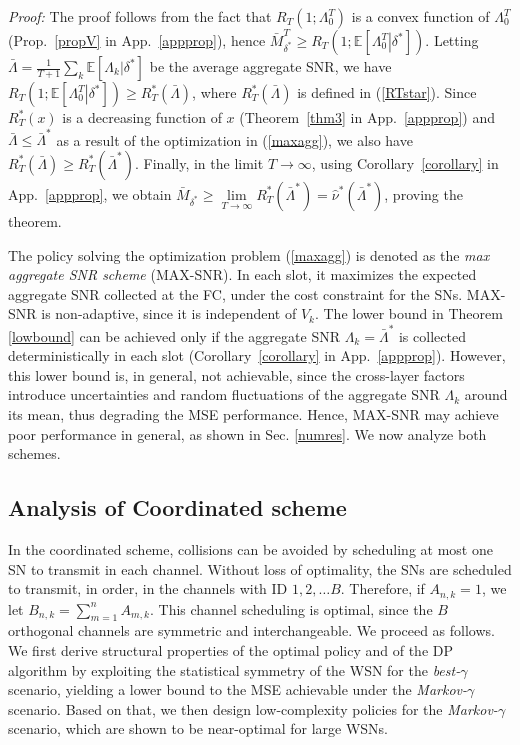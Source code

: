 \documentclass[10pt,twocolumn,twoside]{IEEEtran}
\theoremstyle{plain}
\begin{document}
\noindent\emph{Proof:}
The proof follows from the fact that $R_T(1;\Lambda_0^T)$ is a convex function of $\Lambda_0^T$ (Prop.~\ref{propV} in App.~\ref{appprop}),
hence $\bar M_{\delta^*}^T{\geq}R_T(1;\mathbb E\left[\left.\Lambda_0^T\right|\delta^*\right])$. 
Letting $\bar \Lambda{=}\frac{1}{T+1}\sum_{k}\mathbb E\left[\left.\Lambda_k\right|\delta^*\right]$ be the average aggregate SNR, we have 
$R_T(1;\mathbb E\left[\left.\Lambda_0^T\right|\delta^*\right]){\geq}R_T^*(\bar\Lambda)$,
where $R_T^*(\bar\Lambda)$ is defined in (\ref{RTstar}). Since $R_T^*(x)$ is a decreasing function of $x$ (Theorem~\ref{thm3} in App.~\ref{appprop}) and 
$\bar\Lambda{\leq}\bar\Lambda^*$ as a result of the optimization in (\ref{maxagg}),
we also have $R_T^*(\bar\Lambda){\geq}R_T^*(\bar\Lambda^*)$. Finally, in the limit $T{\to}\infty$, using Corollary~\ref{corollary} in App.~\ref{appprop},
we obtain $\bar M_{\delta^*}{\geq}\underset{T\to\infty}{\lim}R_T^*(\bar\Lambda^*){=}\hat \nu^*\left(\bar\Lambda^*\right)$, proving the theorem.\hfill\QED


The policy solving the optimization problem (\ref{maxagg}) is denoted as the \emph{max aggregate SNR scheme} (MAX-SNR). In each slot, it maximizes the expected 
aggregate SNR collected at the FC, under the cost constraint for the SNs.
MAX-SNR is non-adaptive, since it is independent of $V_k$.
The lower bound in Theorem \ref{lowbound} can be achieved only if the aggregate SNR $\Lambda_k{=}\bar\Lambda^*$ is collected deterministically in each slot
 (Corollary~\ref{corollary} in App.~\ref{appprop}).
However, this lower bound is, in general, not achievable, 
since the cross-layer factors introduce uncertainties and random fluctuations of the aggregate SNR $\Lambda_k$ around its mean, thus
degrading the MSE performance. Hence, MAX-SNR may achieve poor performance in general, as shown in Sec. \ref{numres}.
We now analyze both schemes.
\vspace{-3mm}
\subsection{Analysis  of Coordinated scheme}
\label{centr}
\noindent In the coordinated scheme, collisions can be avoided by scheduling at most one SN to transmit in each channel.
Without loss of optimality, the SNs are scheduled to transmit, in order, in
the channels with ID $1,2,\dots B$. Therefore,
if $A_{n,k}{=}1$, we let $B_{n,k}{=}\sum_{m=1}^{n}A_{m,k}$. This channel scheduling is optimal, since the $B$ orthogonal channels are symmetric and interchangeable.
We proceed as follows. We first derive structural properties of the optimal policy and of the DP
algorithm by exploiting the statistical symmetry of the WSN for the \emph{best-}$\gamma$ scenario, yielding a lower bound to the MSE
achievable under the  \emph{Markov-}$\gamma$ scenario.
Based on that, we then
design low-complexity policies for the
 \emph{Markov-}$\gamma$ scenario, 
 which are shown to be near-optimal for large WSNs.
\end{document}
